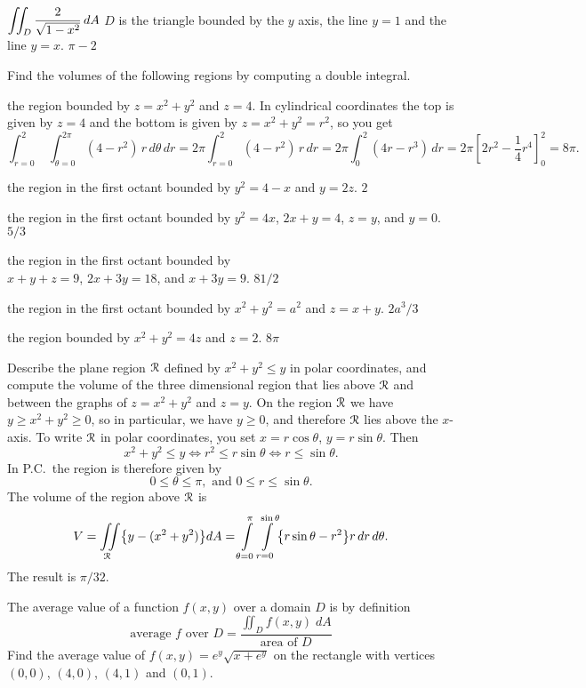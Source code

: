 \subprob $\displaystyle \iint_D {2\over\sqrt{1-x^2}}\,dA $ 
\hfill$D$ is the triangle bounded by the $y$ axis, the line $y=1$ and
the line $y=x$.
\answer
$\pi-2$
\endanswer


\problem Find the volumes of the following regions by computing a double integral.

\subprob the region bounded by $z=x^2+y^2$ and $z=4$. 
\answer
In cylindrical coordinates the top is given by $z=4$ and the bottom is given by $z=x^2+y^2=r^2$, so you get
\[
  \int_{r=0}^2\; \int_{\theta=0}^{2\pi} (4-r^2) \, r \,d\theta\, dr
  = 2\pi \int_{r=0}^2 (4-r^2) \, r \, dr 
  = 2\pi \int_0^2 (4r-r^3 )\, dr 
  = 2\pi\left[2r^2-\frac14r^4\right]_0^2 
  = 8\pi.
\]
\endanswer


\subprob the region in the first octant bounded by $y^2=4-x$ and $y=2z$.
\answer
$2$
\endanswer


\subprob the region in the first octant bounded by $y^2=4x$, $2x+y=4$, $z=y$,
and $y=0$.
\answer
$5/3$
\endanswer

\subprob the region in the first octant bounded by\\
$x+y+z=9$, $2x+3y=18$, and $x+3y=9$.
\answer
$81/2$
\endanswer

\subprob the region in the first octant bounded by $x^2+y^2=a^2$ and $z=x+y$.
\answer
$2a^3/3$
\endanswer

\subprob the region bounded by $x^2+y^2=4z$ and $z=2$. 
\answer
$8\pi$
\endanswer

\problem Describe the plane region $\mathcal{R}$ defined by $x^2+y^2 \leq y$ in polar coordinates, and compute the volume of the three dimensional region that lies above $\mathcal{R}$ and between the graphs of $z=x^2+y^2$ and $z=y$.
\answer
On the region $\mathcal{R}$ we have $y\geq x^2+y^2 \geq0$, so in particular, we have $y\geq0$, and therefore  $\mathcal{R}$ lies above the $x$-axis.
To write $\mathcal{R}$ in polar coordinates, you set $x=r\cos\theta$, $y=r\sin\theta$.  Then
\[
x^2+y^2 \leq y \iff r^2 \leq r\sin\theta \iff r\leq \sin\theta.
\]
In P.C.~the region is therefore given by
\[
0\leq\theta\leq \pi, \text{ and }0\leq r\leq \sin\theta.
\]
The volume of the region above $\mathcal{R}$ is
\[
V = \iint\limits_{\mathcal{R}} \bigl\{y - (x^2+y^2)\bigr\} dA
=\int\limits_{\theta=0}^\pi \int\limits_{r=0}^{\sin\theta}
\bigl\{r\sin\theta - r^2\bigr\} r\, dr\, d\theta.
\]
The result is $\pi/32$.
\endanswer

\problem The average value of a function $f(x, y)$ over a domain $D$ is by definition
\[
\text{average $f$ over $D$}
=
\frac{\iint_D f(x, y) \;  dA}{\text{area of }D}
\]
Find the average value of $f(x,y)=e^y\sqrt{x+e^y}$ on the rectangle
with vertices $(0,0)$, $(4,0)$, $(4,1)$ and $(0,1)$.

